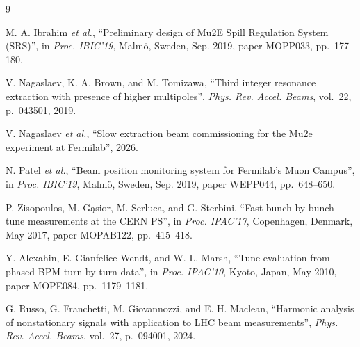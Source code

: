 \documentclass[]{jacow}
\begin{document}
\begin{thebibliography}{9}

M. A. Ibrahim \textit{et al.}, ``Preliminary design of Mu2E Spill Regulation System (SRS)'', in \textit{Proc. IBIC'19}, Malm\"o, Sweden, Sep. 2019, paper MOPP033, pp.~177--180. 

V. Nagaslaev, K. A. Brown, and M. Tomizawa, ``Third integer resonance extraction with presence of higher multipoles'', \textit{Phys. Rev. Accel. Beams}, vol.~22, p.~043501, 2019. 

V. Nagaslaev \textit{et al.}, ``Slow extraction beam commissioning for the Mu2e experiment at Fermilab'', 2026. 

N. Patel \textit{et al.}, ``Beam position monitoring system for Fermilab's Muon Campus'', in \textit{Proc. IBIC'19}, Malm\"o, Sweden, Sep. 2019, paper WEPP044, pp.~648--650. 

P. Zisopoulos, M. G\k{a}sior, M. Serluca, and G. Sterbini, ``Fast bunch by bunch tune measurements at the CERN PS'', in \textit{Proc. IPAC'17}, Copenhagen, Denmark, May 2017, paper MOPAB122, pp.~415--418. 

Y. Alexahin, E. Gianfelice-Wendt, and W. L. Marsh, ``Tune evaluation from phased BPM turn-by-turn data'', in \textit{Proc. IPAC'10}, Kyoto, Japan, May 2010, paper MOPE084, pp.~1179--1181.

G. Russo, G. Franchetti, M. Giovannozzi, and E. H. Maclean, ``Harmonic analysis of nonstationary signals with application to LHC beam measurements'', \textit{Phys. Rev. Accel. Beams}, vol.~27, p.~094001, 2024. 

\end{thebibliography}
\end{document}
